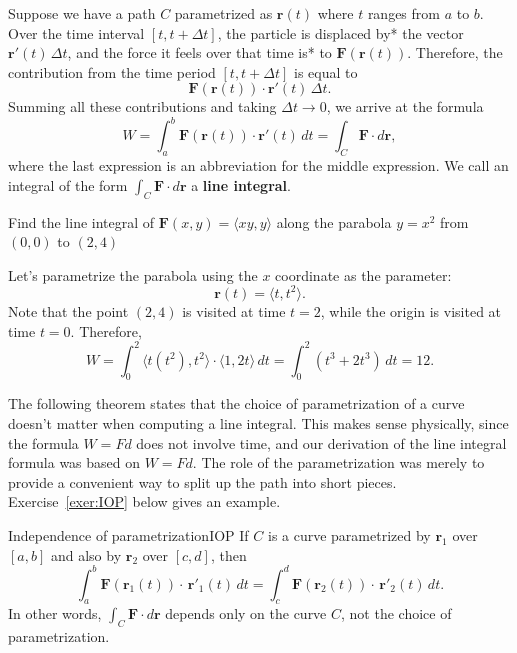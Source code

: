 \documentclass[svgnames]{watsonbook}
\begin{document}
Suppose we have a path $C$ parametrized as $\mathbf{r}(t)$ where $t$
ranges from $a$ to $b$. Over the time interval $[t,t+\Delta t]$, the
particle is displaced by* the vector $\mathbf{r}'(t) \, \Delta t$, and
the force it feels over that time is* to $\mathbf{F}(\mathbf{r}(t))$.
Therefore, the contribution from the time period $[t, t+\Delta t]$ is
equal to 
\[
  \mathbf{F}(\mathbf{r}(t)) \cdot \mathbf{r}'(t) \, \Delta t. 
\]
Summing all these contributions and taking $\Delta t \to 0$, we arrive
at the formula
\[
  W = \int_a^b \mathbf{F}(\mathbf{r}(t)) \cdot \mathbf{r}'(t) \, dt =
  \int_C \mathbf{F} \cdot d\mathbf{r}, 
\]
where the last expression is an abbreviation for the middle
expression. We call an integral of the form $\int_C \mathbf{F} \cdot
d\mathbf{r}$ a \textbf{line integral}. 

\begin{example}{}{}
  Find the line integral of $\mathbf{F}(x,y) = \langle xy, y \rangle$
  along the parabola $y = x^2$ from 
  $(0,0)$ to $(2,4)$
\end{example}

\begin{solution}
  Let's parametrize the parabola using the $x$ coordinate as the
  parameter:
  \[
    \mathbf{r}(t) = \langle t, t^2 \rangle. 
  \]
  Note that the point $(2,4)$ is visited at time $t=2$, while the
  origin is visited at time $t=0$. Therefore, 
  \[
    W = \int_0^2 \langle t(t^2), t^2 \rangle \cdot \langle 1, 2t \rangle
    \, dt = \int_0^2 (t^3 + 2t^3) \, dt = \boxed{12}. 
  \]
\end{solution}

The following theorem states that the choice of parametrization of a
curve doesn't matter when computing a line integral. This makes sense
physically, since the formula $W = Fd$ does not involve time, and our
derivation of the line integral formula was based on $W=Fd$. The role
of the parametrization was merely to provide a convenient way to split
up the path into short pieces. Exercise~\ref{exer:IOP} below gives an
example.

\begin{theo}{Independence of parametrization}{IOP}
  If $C$ is a curve parametrized by $\mathbf{r}_1$ over $[a,b]$ and
  also by $\mathbf{r}_2$ over $[c,d]$, then
  \[
    \int_a^b\mathbf{F}(\mathbf{r}_1(t))  \cdot \,
    \mathbf{r}'_1(t) \, dt =
    \int_c^d \mathbf{F}(\mathbf{r}_2(t))  \cdot \,
    \mathbf{r}'_2(t) \, dt. 
  \]
  In other words, $\int_C \mathbf{F} \cdot d\mathbf{r}$ depends only
  on the curve $C$, not the choice of parametrization. 
\end{theo}
\end{document}
